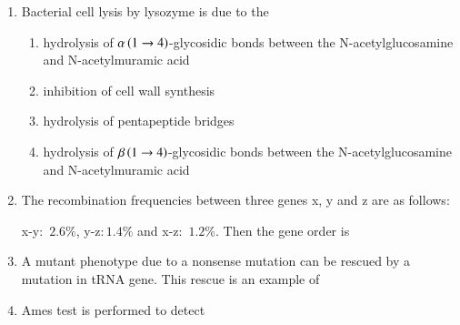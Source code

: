 \documentclass[journal,12pt,onecolumn]{IEEEtran}
\theoremstyle{remark}
\begin{document}
\begin{enumerate}
\item Bacterial cell lysis by lysozyme is due to the

\hfill{}

\begin{enumerate}
\item hydrolysis of $\alpha\brak{1 \to 4}$-glycosidic bonds between the N-acetylglucosamine and N-acetylmuramic acid
\item inhibition of cell wall synthesis
\item hydrolysis of pentapeptide bridges
\item hydrolysis of $\beta\brak{1 \to 4}$-glycosidic bonds between the N-acetylglucosamine and N-acetylmuramic acid
\end{enumerate}

\item The recombination frequencies between three genes x, y and z are as follows$\colon$

x-y$\colon$ $2.6\%$, y-z$\colon$$1.4\%$ and x-z$\colon$ $1.2\%$. Then the gene order is

\hfill{}

\begin{enumerate}
\end{enumerate}

\item A mutant phenotype due to a nonsense mutation can be rescued by a mutation in tRNA gene. This rescue is an example of

\hfill{}

\begin{enumerate}
\end{enumerate}

\item Ames test is performed to detect


\end{enumerate}
\end{document}
